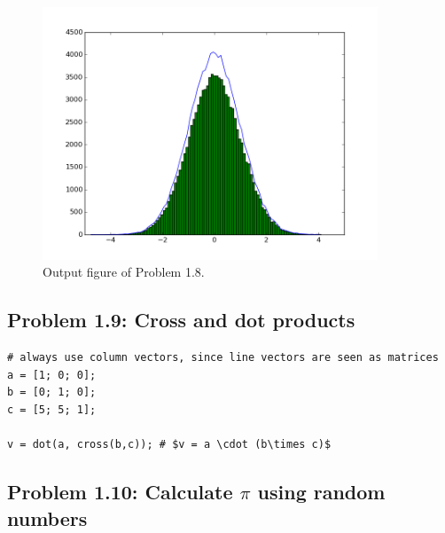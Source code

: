 \begin{figure}[ht!]
 \centering
 \includegraphics[width=10cm,keepaspectratio=true]{Prob-1-8.png}
 \caption{Output figure of Problem 1.8.}
 \label{fig:probl1.8}
\end{figure}


\subsection*{Problem 1.9: Cross and dot products}

\begin{verbatim}
# always use column vectors, since line vectors are seen as matrices
a = [1; 0; 0]; 
b = [0; 1; 0];
c = [5; 5; 1];

v = dot(a, cross(b,c)); # $v = a \cdot (b\times c)$
\end{verbatim}

\subsection*{Problem 1.10: Calculate $\pi$ using random numbers}

